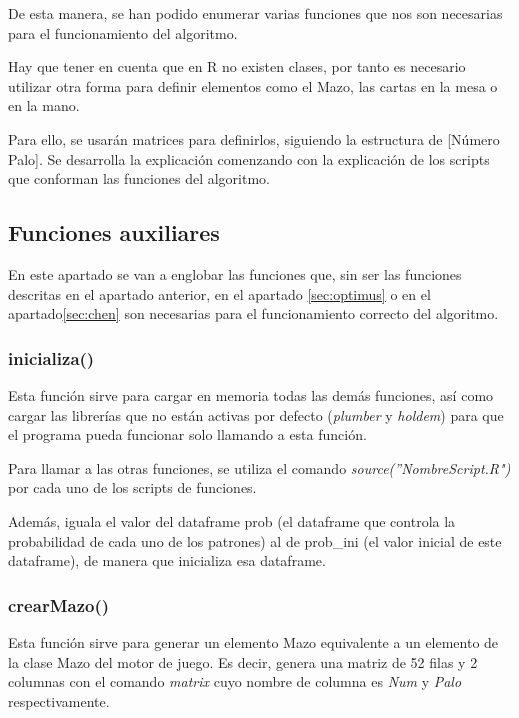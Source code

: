 De esta manera, se han podido enumerar varias funciones que nos son necesarias para el funcionamiento del algoritmo.

Hay que tener en cuenta que en R no existen clases, por tanto es necesario utilizar otra forma para definir elementos como el Mazo, las cartas en la mesa o en la mano.  

Para ello, se usarán matrices para definirlos, siguiendo la estructura de [Número Palo]. 
Se desarrolla la explicación comenzando con la explicación de los scripts que conforman las funciones del algoritmo. 

\subsection{Funciones auxiliares}

En este apartado se van a englobar las funciones que, sin ser las funciones descritas en el apartado anterior, en el apartado \ref{sec:optimus} o en el apartado\ref{sec:chen} son necesarias para el funcionamiento correcto del algoritmo.

\subsubsection{inicializa()}

Esta función sirve para cargar en memoria todas las demás funciones, así como cargar las librerías que no están activas por defecto (\textit{plumber} y \textit{holdem}) para que el programa pueda funcionar solo llamando a esta función.

Para llamar a las otras funciones, se utiliza el comando \textit{source(''NombreScript.R")} por cada uno de los scripts de funciones.

Además, iguala el valor del dataframe prob (el dataframe que controla la probabilidad de cada uno de los patrones) al de prob\_ini (el valor inicial de este dataframe), de manera que inicializa esa dataframe.

\subsubsection{crearMazo()}

Esta función sirve para generar un elemento Mazo equivalente a un elemento de la clase Mazo del motor de juego. Es decir, genera una matriz de 52 filas y 2 columnas con el comando \textit{matrix} cuyo nombre de columna es \textit{Num} y \textit{Palo} respectivamente.

